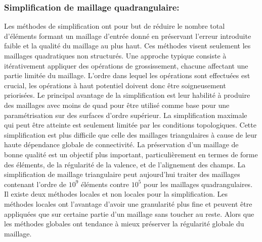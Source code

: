 \documentclass[runningheads]{llncs}
\begin{document}
\subsubsection{Simplification de maillage quadrangulaire:}Les méthodes de simplification ont pour but de réduire le nombre total d'éléments formant un maillage d'entrée donné en préservant l’erreur introduite faible et la qualité du maillage au plus haut. Ces méthodes visent seulement les maillages quadratiques non structurés.
Une approche typique consiste à itérativement appliquer des opérations de grossissement, chacune affectant une partie limitée du maillage. L’ordre dans lequel les opérations sont effectuées est crucial, les opérations à haut potentiel doivent donc être soigneusement priorisées. Le principal avantage de la simplification est leur habilité à produire des maillages avec moins de quad pour être utilisé comme base pour une paramétrisation sur des surfaces d’ordre supérieur. La simplification maximale qui peut être atteinte est seulement limitée par les conditions topologiques. Cette simplification est plus difficile que celle des maillages triangulaires à cause de leur haute dépendance globale de connectivité. La préservation d’un maillage de bonne qualité est un objectif plus important, particulièrement en termes de forme des éléments, de la régularité de la valence, et de l'alignement des champs. La simplification de maillage triangulaire peut aujourd’hui traiter des maillages contenant l’ordre de $10^{9}$ éléments contre $10^{5}$ pour les maillages quadrangulaires. Il existe deux méthodes locales et non locales pour la simplification. Les méthodes locales ont l’avantage d’avoir une granularité plus fine et peuvent être appliquées que sur certaine partie d’un maillage sans toucher au reste. Alors que les méthodes globales ont tendance à mieux préserver la régularité globale du maillage.
\end{document}
